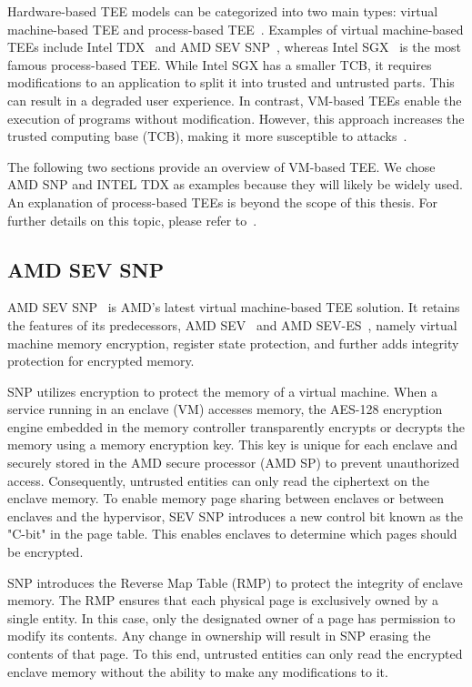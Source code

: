 Hardware-based TEE models can be categorized into two main types: virtual machine-based TEE and process-based TEE~\cite*{10.3389/fcomp.2022.930741}. Examples of virtual machine-based TEEs include Intel TDX~\cite*{Intel_tdx_whitepaper} and AMD SEV SNP~\cite*{SEV_SNP_white_book}, whereas Intel SGX~\cite*{INTEL_SGX} is the most famous process-based TEE. 
While Intel SGX has a smaller TCB, it requires modifications to an application to split it into trusted and untrusted parts. This can result in a degraded user experience. In contrast, VM-based TEEs enable the execution of programs without modification. However, this approach increases the 
trusted computing base (TCB), making it more susceptible to attacks~\cite*{Execution_Environment_landscape}.

The following two sections provide an overview of VM-based TEE. We chose AMD SNP and INTEL TDX as examples because they will likely be widely used. An explanation of process-based TEEs is beyond the scope of this thesis. For further details on this topic, please refer to~\cite*{cryptoeprint:2016/086, 10.1145/2487726.2488370}.


\subsection{AMD SEV SNP}

AMD SEV SNP~\cite*{SEV_SNP_white_book} is AMD's latest virtual machine-based TEE solution. It retains the features of its predecessors, AMD SEV~\cite*{sev} and AMD SEV-ES~\cite*{sev_es}, namely virtual machine memory encryption, register state protection, and further adds integrity protection for 
encrypted memory.


SNP utilizes encryption to protect the memory of a virtual machine. When a service running in an enclave (VM) accesses memory, the AES-128 encryption engine embedded in the memory controller transparently encrypts or decrypts the memory using a memory encryption key.  This key is unique for each 
enclave and securely stored in the AMD secure processor (AMD SP) to prevent unauthorized access. Consequently, untrusted entities can only read the ciphertext on the enclave memory. To enable memory page sharing between enclaves or between enclaves and the hypervisor, SEV SNP introduces a new 
control bit known as the "C-bit" in the page table. This enables enclaves to determine which pages should be encrypted.


SNP introduces the Reverse Map Table (RMP) to protect the integrity of enclave memory. The RMP ensures that each physical page is exclusively owned by a single entity. In this case, only the designated owner of a page has permission to modify its contents. Any change in ownership 
will result in SNP erasing the contents of that page. To this end, untrusted entities can only read the encrypted enclave memory without the ability to make any modifications to it.

